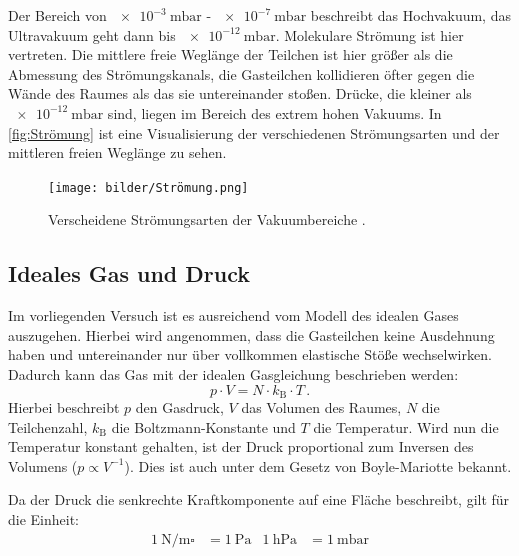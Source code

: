         \noindent
        Der Bereich von $\SI{e-3}{\milli\bar}$ - $\SI{e-7}{\milli\bar}$ beschreibt das Hochvakuum, das Ultravakuum geht dann bis $\SI{e-12}{\milli\bar}$.
        Molekulare Strömung ist hier vertreten.
        Die mittlere freie Weglänge der Teilchen ist hier größer als die Abmessung des Strömungskanals, die Gasteilchen kollidieren öfter gegen die Wände des Raumes als das sie untereinander stoßen.
        \noindent
        Drücke, die kleiner als $\SI{e-12}{\milli\bar}$ sind, liegen im Bereich des extrem hohen Vakuums.
        \noindent
        In \autoref{fig:Strömung} ist eine Visualisierung der verschiedenen Strömungsarten und der mittleren freien Weglänge zu sehen.

        \begin{figure}
            \centering
            \texttt{[image: bilder/Strömung.png]}
            \caption{Verscheidene Strömungsarten der Vakuumbereiche \cite{Pfeiffer}.}
            \label{fig:Strömung}
        \end{figure}

    \subsection{Ideales Gas und Druck}
        Im vorliegenden Versuch ist es ausreichend vom Modell des idealen Gases auszugehen.
        Hierbei wird angenommen, dass die Gasteilchen keine Ausdehnung haben und untereinander nur über vollkommen elastische Stöße wechselwirken.
        Dadurch kann das Gas mit der idealen Gasgleichung beschrieben werden:
        \begin{equation*}
            p \cdot V = N \cdot k_\text{B} \cdot T \, .
        \end{equation*}
        Hierbei beschreibt $p$ den Gasdruck, $V$ das Volumen des Raumes, $N$ die Teilchenzahl, $k_\text{B}$ die Boltzmann-Konstante und $T$ die Temperatur.
        Wird nun die Temperatur konstant gehalten, ist der Druck proportional zum Inversen des Volumens ($p \propto V^{-1}$).
        Dies ist auch unter dem Gesetz von Boyle-Mariotte bekannt.

        \noindent
        Da der Druck die senkrechte Kraftkomponente auf eine Fläche beschreibt, gilt für die Einheit:
        \begin{align*}
            \SI{1}{\newton\per\metre\square} &= \SI{1}{\pascal}& \SI{1}{\hecto\pascal} &= \SI{1}{\milli\bar} 
        \end{align*}

